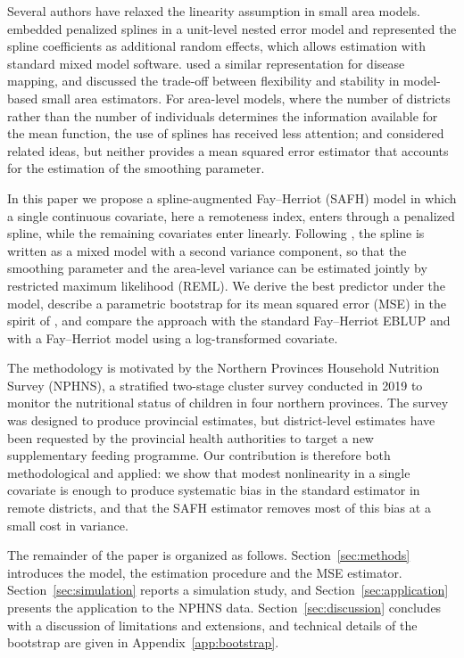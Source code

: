 Several authors have relaxed the linearity assumption in small area models.
\citet{opsomer2008nonparametric} embedded penalized splines in a unit-level
nested error model and represented the spline coefficients as additional random
effects, which allows estimation with standard mixed model software.
\citet{ugarte2009spline} used a similar representation for disease mapping, and
\citet{sperlich2016model} discussed the trade-off between flexibility and
stability in model-based small area estimators. For area-level models, where the
number of districts rather than the number of individuals determines the
information available for the mean function, the use of splines has received
less attention; \citet{giusti2012semiparametric} and
\citet{marchetti2023robust} considered related ideas, but neither provides a
mean squared error estimator that accounts for the estimation of the smoothing
parameter.

In this paper we propose a spline-augmented Fay--Herriot (SAFH) model in which a
single continuous covariate, here a remoteness index, enters through a penalized
spline, while the remaining covariates enter linearly. Following
\citet{ruppert2003semiparametric}, the spline is written as a mixed model with a
second variance component, so that the smoothing parameter and the area-level
variance can be estimated jointly by restricted maximum likelihood (REML). We
derive the best predictor under the model, describe a parametric bootstrap for
its mean squared error (MSE) in the spirit of \citet{butar2003measuring}, and
compare the approach with the standard Fay--Herriot EBLUP and with a
Fay--Herriot model using a log-transformed covariate.

The methodology is motivated by the Northern Provinces Household Nutrition
Survey (NPHNS), a stratified two-stage cluster survey conducted in 2019 to
monitor the nutritional status of children in four northern provinces. The
survey was designed to produce provincial estimates, but district-level
estimates have been requested by the provincial health authorities to target a
new supplementary feeding programme. Our contribution is therefore both
methodological and applied: we show that modest nonlinearity in a single
covariate is enough to produce systematic bias in the standard estimator in
remote districts, and that the SAFH estimator removes most of this bias at a
small cost in variance.

The remainder of the paper is organized as follows. Section~\ref{sec:methods}
introduces the model, the estimation procedure and the MSE estimator.
Section~\ref{sec:simulation} reports a simulation study, and
Section~\ref{sec:application} presents the application to the NPHNS data.
Section~\ref{sec:discussion} concludes with a discussion of limitations and
extensions, and technical details of the bootstrap are given in
Appendix~\ref{app:bootstrap}.
